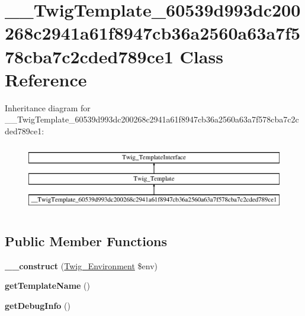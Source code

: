 \hypertarget{class_____twig_template__60539d993dc200268c2941a61f8947cb36a2560a63a7f578cba7c2cded789ce1}{}\section{\+\_\+\+\_\+\+Twig\+Template\+\_\+60539d993dc200268c2941a61f8947cb36a2560a63a7f578cba7c2cded789ce1 Class Reference}
\label{class_____twig_template__60539d993dc200268c2941a61f8947cb36a2560a63a7f578cba7c2cded789ce1}
Inheritance diagram for \+\_\+\+\_\+\+Twig\+Template\+\_\+60539d993dc200268c2941a61f8947cb36a2560a63a7f578cba7c2cded789ce1\+:\begin{figure}[H]
\begin{center}
\leavevmode
\includegraphics[height=3.000000cm]{class_____twig_template__60539d993dc200268c2941a61f8947cb36a2560a63a7f578cba7c2cded789ce1}
\end{center}
\end{figure}
\subsection*{Public Member Functions}
\begin{DoxyCompactItemize}
\item 
\hypertarget{class_____twig_template__60539d993dc200268c2941a61f8947cb36a2560a63a7f578cba7c2cded789ce1_a4f8326243132c1450a81e0a817aa1be7}{}{\bfseries \+\_\+\+\_\+construct} (\hyperlink{class_twig___environment}{Twig\+\_\+\+Environment} \$env)\label{class_____twig_template__60539d993dc200268c2941a61f8947cb36a2560a63a7f578cba7c2cded789ce1_a4f8326243132c1450a81e0a817aa1be7}

\item 
\hypertarget{class_____twig_template__60539d993dc200268c2941a61f8947cb36a2560a63a7f578cba7c2cded789ce1_a621a3ccd148ed8b9e937da6959c98f39}{}{\bfseries get\+Template\+Name} ()\label{class_____twig_template__60539d993dc200268c2941a61f8947cb36a2560a63a7f578cba7c2cded789ce1_a621a3ccd148ed8b9e937da6959c98f39}

\item 
\hypertarget{class_____twig_template__60539d993dc200268c2941a61f8947cb36a2560a63a7f578cba7c2cded789ce1_abd0ecb0136f4228db2bd963bfc1e20d7}{}{\bfseries get\+Debug\+Info} ()\label{class_____twig_template__60539d993dc200268c2941a61f8947cb36a2560a63a7f578cba7c2cded789ce1_abd0ecb0136f4228db2bd963bfc1e20d7}

\end{DoxyCompactItemize}
